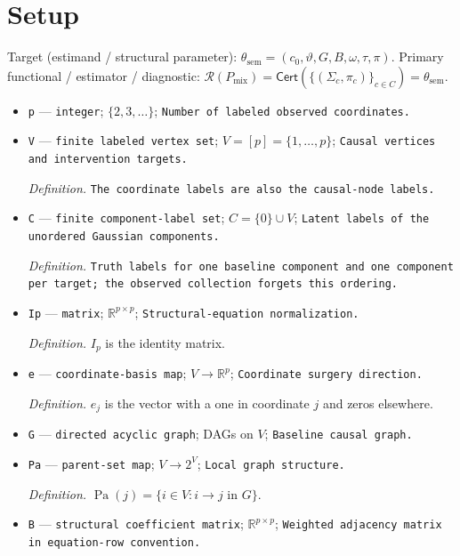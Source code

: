 \documentclass{article}
\begin{document}
\section{Setup}

Target (estimand / structural parameter): \(\theta_{\mathrm{sem}}=(c_0,\vartheta,G,B,\omega,\tau,\pi)\).
Primary functional / estimator / diagnostic: \(\mathcal R(P_{\mathrm{mix}})=\mathsf{Cert}(\{(\Sigma_c,\pi_c)\}_{c\in C})=\theta_{\mathrm{sem}}\).
\begin{itemize}
  \item \texttt{p} --- \texttt{integer}; \(\{2,3,\ldots\}\); \texttt{Number of labeled observed coordinates.}
  \item \texttt{V} --- \texttt{finite labeled vertex set}; \(V=[p]=\{1,\ldots,p\}\); \texttt{Causal vertices and intervention targets.}
  \par\smallskip\noindent\emph{Definition.} \texttt{The coordinate labels are also the causal-\allowbreak{}node labels.}
  \item \texttt{C} --- \texttt{finite component-\allowbreak{}label set}; \(C=\{0\}\cup V\); \texttt{Latent labels of the unordered Gaussian components.}
  \par\smallskip\noindent\emph{Definition.} \texttt{Truth labels for one baseline component and one component per target;\allowbreak{} the observed collection forgets this ordering.}
  \item \texttt{Ip} --- \texttt{matrix}; \(\mathbb R^{p\times p}\); \texttt{Structural-\allowbreak{}equation normalization.}
  \par\smallskip\noindent\emph{Definition.} \(I_p\) is the identity matrix.
  \item \texttt{e} --- \texttt{coordinate-\allowbreak{}basis map}; \(V\to\mathbb R^p\); \texttt{Coordinate surgery direction.}
  \par\smallskip\noindent\emph{Definition.} \(e_j\) is the vector with a one in coordinate \(j\) and zeros elsewhere.
  \item \texttt{G} --- \texttt{directed acyclic graph}; DAGs on \(V\); \texttt{Baseline causal graph.}
  \item \texttt{Pa} --- \texttt{parent-\allowbreak{}set map}; \(V\to 2^V\); \texttt{Local graph structure.}
  \par\smallskip\noindent\emph{Definition.} \(\operatorname{Pa}(j)=\{i\in V:i\to j\text{ in }G\}\).
  \item \texttt{B} --- \texttt{structural coefficient matrix}; \(\mathbb R^{p\times p}\); \texttt{Weighted adjacency matrix in equation-\allowbreak{}row convention.}

\end{itemize}
\end{document}
